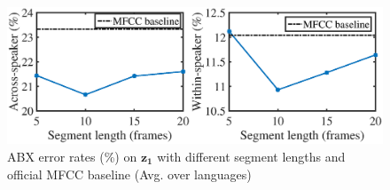 \documentclass[a4paper]{article}
\begin{document}
\begin{figure}[t]
    \centering
    \includegraphics[width=0.92\linewidth]{tune_seg_len2_export_setup.eps}
    \caption{ABX error rates (\%) on  $\bm{z_1}$ with  different segment lengths and official MFCC baseline \cite{dunbar2017zero} (Avg. over languages)}
    \label{fig:tune_len}
\end{figure}


\end{document}
